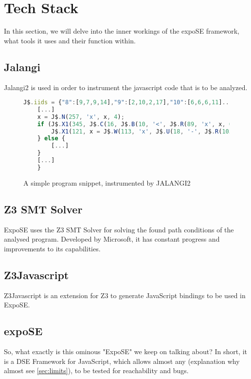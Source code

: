 \section{Tech Stack}
\label{sec:tech}
In this section, we will delve into the inner workings of the expoSE framework, what tools it uses and their function within.


\subsection{Jalangi}
\label{sec:jalangi}

Jalangi2 is used in order to instrument the javascript code that is to be analyzed. 
\begin{figure}[ht]
    \begin{lstlisting}[language=JavaScript, gobble=4]
    J$.iids = {"8":[9,7,9,14],"9":[2,10,2,17],"10":[6,6,6,11]...,"nBranches":6}
    [...]
    x = J$.N(257, 'x', x, 4);
    if (J$.X1(345, J$.C(16, J$.B(10, '<', J$.R(89, 'x', x, 0), J$.T(97, 0, 22, false), 0)))) {
        J$.X1(121, x = J$.W(113, 'x', J$.U(18, '-', J$.R(105, 'x', x, 0)), x, 0));
    } else {
        [...]
    }
    [...]
    }

    \end{lstlisting}
    \caption{A simple program snippet, instrumented by JALANGI2}
    \label{fig:code-snippet}
\end{figure}
 
\subsection{Z3 SMT Solver}
\label{sec:z3}


ExpoSE uses the Z3 SMT Solver for solving the found path conditions of the analysed program. Developed by Microsoft, it has constant progress and improvements to its capabilities. 

\subsection{Z3Javascript}
\label{sec:z3js}

Z3Javascript is an extension for Z3 to generate JavaScript bindings to be used in ExpoSE.


\subsection{expoSE}
\label{sec:expose}
So, what exactly is this ominous "ExpoSE" we keep on talking about? 
In short, it is a DSE Framework for JavaScript, which allows almost any (explanation why almost see \autoref{sec:limits}), to be tested for reachability and bugs.

